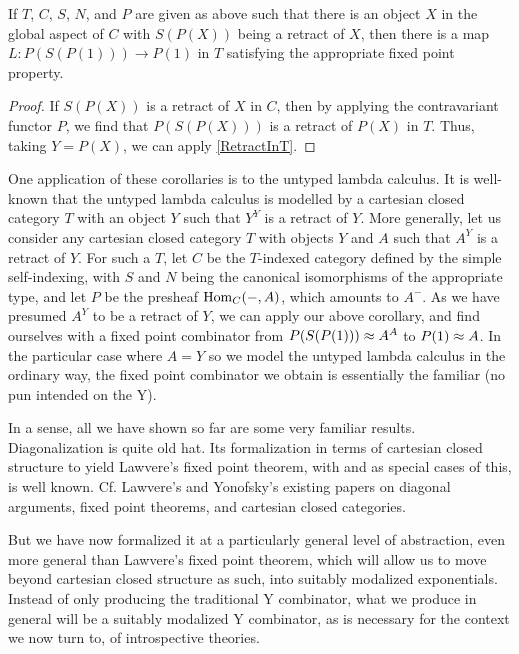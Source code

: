 \begin{corollary}\label{RetractInC}
If $T$, $C$, $S$, $N$, and $P$ are given as above such that there is an object $X$ in the global aspect of $C$ with $S(P(X))$ being a retract of $X$, then there is a map $L : P(S(P(1))) \to P(1)$ in $T$ satisfying the appropriate fixed point property.
\end{corollary}
\begin{proof}
If $S(P(X))$ is a retract of $X$ in $C$, then by applying the contravariant functor $P$, we find that $P(S(P(X)))$ is a retract of $P(X)$ in $T$. Thus, taking $Y = P(X)$, we can apply \cref{RetractInT}.
\end{proof}

\begin{observation}\label{YCombinator}
One application of these corollaries is to the untyped lambda calculus. It is well-known that the untyped lambda calculus is modelled by a cartesian closed category $T$ with an object $Y$ such that $Y^Y$ is a retract of $Y$. More generally, let us consider any cartesian closed category $T$ with objects $Y$ and $A$ such that $A^Y$ is a retract of $Y$. For such a $T$, let $C$ be the $T$-indexed category defined by the simple self-indexing, with $S$ and $N$ being the canonical isomorphisms of the appropriate type, and let $P$ be the presheaf $\operatorname{Hom}_C(-, A)$, which amounts to $A^{-}$. As we have presumed $A^Y$ to be a retract of $Y$, we can apply our above corollary, and find ourselves with a fixed point combinator from $P(S(P(1))) \approx A^A$ to $P(1) \approx A$. In the particular case where $A = Y$ so we model the untyped lambda calculus in the ordinary way, the fixed point combinator we obtain is essentially the familiar  (no pun intended on the Y).
\end{observation}

In a sense, all we have shown so far are some very familiar results. Diagonalization is quite old hat. Its formalization in terms of cartesian closed structure to yield Lawvere's fixed point theorem, with  and  as special cases of this, is well known. Cf. Lawvere's and Yonofsky's existing papers on diagonal arguments, fixed point theorems, and cartesian closed categories. 

But we have now formalized it at a particularly general level of abstraction, even more general than Lawvere's fixed point theorem, which will allow us to move beyond cartesian closed structure as such, into suitably modalized exponentials. Instead of only producing the traditional Y combinator, what we produce in general will be a suitably modalized Y combinator, as is necessary for the context we now turn to, of introspective theories.

